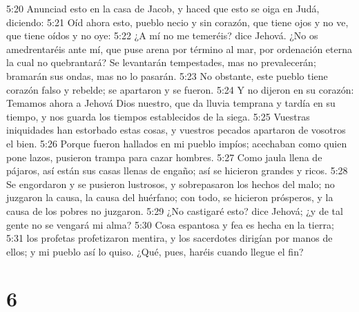5:20 Anunciad esto en la casa de Jacob, y haced que esto se oiga en Judá, diciendo:  
5:21 Oíd ahora esto, pueblo necio y sin corazón, que tiene ojos y no ve, que tiene oídos y no oye: 
5:22 ¿A mí no me temeréis? dice Jehová. ¿No os amedrentaréis ante mí, que puse arena por término al mar, por ordenación eterna la cual no quebrantará? Se levantarán tempestades, mas no prevalecerán; bramarán sus ondas, mas no lo pasarán.  
5:23 No obstante, este pueblo tiene corazón falso y rebelde; se apartaron y se fueron.  
5:24 Y no dijeron en su corazón: Temamos ahora a Jehová Dios nuestro, que da lluvia temprana y tardía en su tiempo, y nos guarda los tiempos establecidos de la siega.  
5:25 Vuestras iniquidades han estorbado estas cosas, y vuestros pecados apartaron de vosotros el bien.  
5:26 Porque fueron hallados en mi pueblo impíos; acechaban como quien pone lazos, pusieron trampa para cazar hombres.  
5:27 Como jaula llena de pájaros, así están sus casas llenas de engaño; así se hicieron grandes y ricos.  
5:28 Se engordaron y se pusieron lustrosos, y sobrepasaron los hechos del malo; no juzgaron la causa, la causa del huérfano; con todo, se hicieron prósperos, y la causa de los pobres no juzgaron.  
5:29 ¿No castigaré esto? dice Jehová; ¿y de tal gente no se vengará mi alma?  
5:30 Cosa espantosa y fea es hecha en la tierra;  
5:31 los profetas profetizaron mentira, y los sacerdotes dirigían por manos de ellos; y mi pueblo así lo quiso. ¿Qué, pues, haréis cuando llegue el fin?  

\chapter{6}

